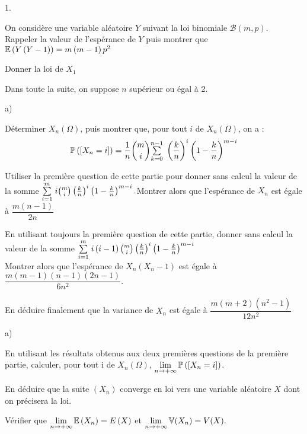 \documentclass[11pt]{article}%
\begin{document}
\begin{noliste}{1.}
 \setlength{\itemsep}{4mm}
\item On considère une variable aléatoire $Y$ suivant la loi
binomiale $\mathcal{B}\left( m,p\right) $. Rappeler la valeur de
l'espérance de $Y$ puis montrer que $\mathbb{E}\left( Y\left( Y-1\right)
\right) = m\left(
m-1\right) p^{2}$

\item Donner la loi de $X_{1}$

\hspace{-1cm}Dans toute la suite, on suppose $n$ supérieur ou égal
à 2.

\item
\begin{noliste}{a)}
 \setlength{\itemsep}{2mm}
\item Déterminer $X_{n}\left( \Omega \right) $, puis montrer que, pour
tout $i$ de $X_{n}\left( \Omega \right) $, on a :
\[
\mathbb{P}\left(\left[ { X_{n} = i} \right]\right) = \frac{1}{n}\binom{m}{i}{\textstyle\sum\limits_{k =
0}^{n-1}}\hspace{.1cm}\left( \frac{k}{n}\right) ^{i}\left( 1-\frac{k}{n}\right) ^{m-i}
\]

\item Utiliser la première question de cette partie pour donner sans
calcul la valeur de la somme $ {\textstyle\sum\limits_{i = 1}^{m}}\hspace{.1cm}i\binom{m}{i}\left(
\frac{k}{n}\right) ^{i}\left( 1-\frac{k}{n}\right) ^{m-i}.\\
$Montrer alors que l'espérance de $X_{n}$ est égale à $ \dfrac{m\left(
n-1\right) }{2n}$

\item En utilisant toujours la première question de cette partie,
donner
sans calcul la valeur de la somme $ {\textstyle\sum\limits_{i = 1}^{m}}\hspace{.1cm}i\left(
i-1\right) \binom{m}{i}\left( \frac{k}{n}\right) ^{i}\left(
1-\frac{k}{n}\right) ^{m-i}$\\
Montrer alors que l'espérance de $X_{n}\left( X_{n}-1\right) $ est
égale à $\dfrac{m\left( m-1\right) \left( n-1\right) \left( 2n-1\right)
}{6n^{2}}.$

\item En déduire finalement que la variance de $X_{n}$ est égale
à $ \dfrac{m\left( m + 2\right) \left( n^{2}-1\right) }{12n^{2}}$
\end{noliste}

\item
\begin{noliste}{a)}
 \setlength{\itemsep}{2mm}
\item En utilisant les résultats obtenus aux deux premières
questions de la première partie, calculer, pour tout i de $X_{n}\left(
\Omega \right) $,\hspace{5mm} $\lim \limits_{n\rightarrow + \infty
}\mathbb{P}\left(\left[ { X_{n} = i} \right]\right) $.

\item En déduire que la suite $\left( X_{n}\right) $ converge en loi
vers une variable aléatoire $X$ dont on précisera la loi.

\item Vérifier que\hspace{5mm} $\lim \limits_{n\rightarrow + \infty
}\mathbb{E}\left( X_{n}\right) = E\left( X\right) $ et $\lim
\limits_{n\rightarrow
 + \infty }\mathbb{V}(X_{n}) = V(X).$
\end{noliste}
\end{noliste}
\end{document}
